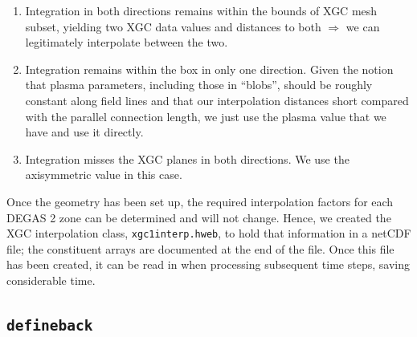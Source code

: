 \documentclass[12pt]{report}
\begin{document}
\begin{enumerate}
\item Integration in both directions remains within
  the bounds of XGC mesh subset, yielding two XGC data
  values and distances to both $\Rightarrow$ we can
  legitimately interpolate between the two.
\item Integration remains within the box in only one direction.
  Given the notion that plasma parameters, including
  those in ``blobs'', should be roughly constant along
  field lines and that our interpolation distances
  short compared with the parallel connection length,
  we just use the plasma value that we have and use
  it directly.
\item Integration misses the XGC planes in both directions.
  We use the axisymmetric value in this case.
\end{enumerate}

Once the geometry has been set up, the required interpolation
factors for each DEGAS 2 zone can be determined and will not
change.  Hence, we created the XGC interpolation class,
{\tt xgc1interp.hweb}, to hold that information in a
netCDF file; the constituent arrays are documented
at the end of the file.  Once this file has been
created, it can be read in when processing
subsequent time steps, saving considerable time.

\subsection{\tt defineback}
\end{document}

